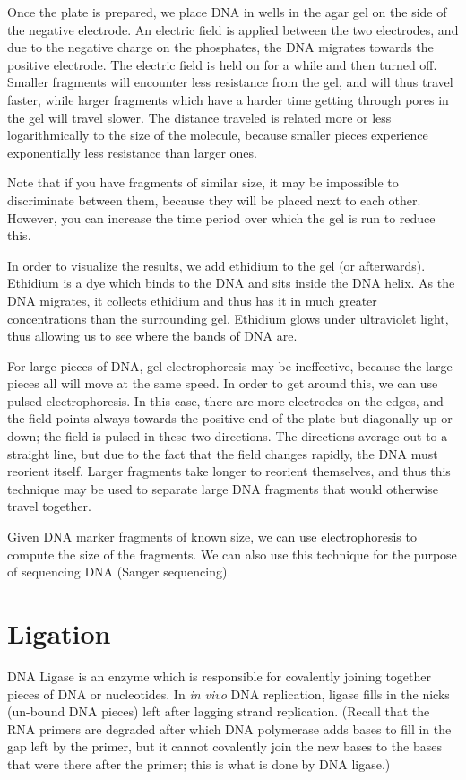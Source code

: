 \documentclass{article}
\begin{document}
Once the plate is prepared, we place DNA in wells in the agar gel on the side of the negative
electrode. An electric field is applied between the two electrodes, and due to the negative charge
on the phosphates, the DNA migrates towards the positive electrode. The electric field is held on
for a while and then turned off. Smaller fragments will encounter less resistance from the gel, and
will thus travel faster, while larger fragments which have a harder time getting through pores in
the gel will travel slower. The distance traveled is related more or less logarithmically to the
size of the molecule, because smaller pieces experience exponentially less resistance than larger
ones.

Note that if you have fragments of similar size, it may be impossible to discriminate between them,
because they will be placed next to each other. However, you can increase the time period over which
the gel is run to reduce this.

In order to visualize the results, we add ethidium to the gel (or afterwards). Ethidium is a dye
which binds to the DNA and sits inside the DNA helix. As the DNA migrates, it collects ethidium and
thus has it in much greater concentrations than the surrounding gel. Ethidium glows under
ultraviolet light, thus allowing us to see where the bands of DNA are.

For large pieces of DNA, gel electrophoresis may be ineffective, because the large pieces all will
move at the same speed. In order to get around this, we can use pulsed electrophoresis. In this
case, there are more electrodes on the edges, and the field points always towards the positive end
of the plate but diagonally up or down; the field is pulsed in these two directions. The directions
average out to a straight line, but due to the fact that the field changes rapidly, the DNA must
reorient itself. Larger fragments take longer to reorient themselves, and thus this technique may be
used to separate large DNA fragments that would otherwise travel together.

Given DNA marker fragments of known size, we can use electrophoresis to compute the size of the
fragments. We can also use this technique for the purpose of sequencing DNA (Sanger sequencing).
\section*{Ligation}
DNA Ligase is an enzyme which is responsible for covalently joining together pieces of DNA or
nucleotides. In \emph{in vivo} DNA replication, ligase fills in the nicks (un-bound DNA pieces) left
after lagging strand replication. (Recall that the RNA primers are degraded after which DNA
polymerase adds bases to fill in the gap left by the primer, but it cannot covalently join the new
bases to the bases that were there after the primer; this is what is done by DNA ligase.) 
\end{document}
